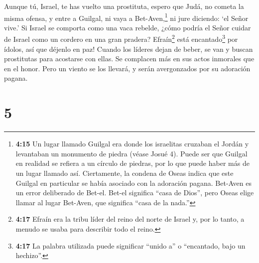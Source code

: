  Aunque tú, Israel, te has vuelto una prostituta, espero
que Judá, no cometa la misma ofensa, y entre a Guilgal, ni vaya a
Bet-Aven,\footnote{\textbf{4:15} Un lugar llamado Guilgal era donde los
  israelitas cruzaban el Jordán y levantaban un monumento de piedra
  (véase Josué 4). Puede ser que Guilgal en realidad se refiera a un
  círculo de piedras, por lo que puede haber más de un lugar llamado
  así. Ciertamente, la condena de Oseas indica que este Guilgal en
  particular se había asociado con la adoración pagana. Bet-Aven es un
  error deliberado de Bet-el. Bet-el significa ``casa de Dios'', pero
  Oseas elige llamar al lugar Bet-Aven, que significa ``casa de la
  nada.''} ni jure diciendo: `el Señor vive.'  Si Israel se
comporta como una vaca rebelde, ¿cómo podría el Señor cuidar de Israel
como un cordero en una gran pradera?  Efraín\footnote{\textbf{4:17}
  Efraín era la tribu líder del reino del norte de Israel y, por lo
  tanto, a menudo se usaba para describir todo el reino.} está
encantado\footnote{\textbf{4:17} La palabra utilizada puede significar
  ``unido a'' o ``encantado, bajo un hechizo''.} por ídolos, así que
déjenlo en paz!  Cuando los líderes dejan de beber, se van
y buscan prostitutas para acostarse con ellas. Se complacen más en sus
actos inmorales que en el honor.  Pero un viento se los
llevará, y serán avergonzados por su adoración pagana.

\hypertarget{section-4}{%
\section{5}\label{section-4}}

